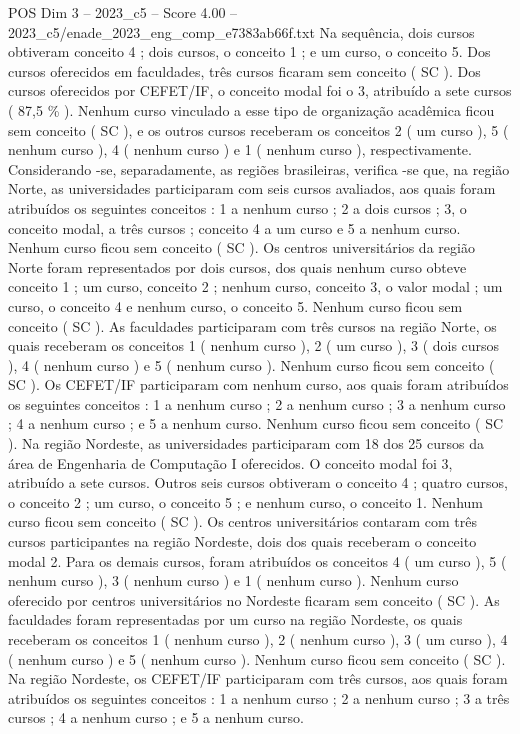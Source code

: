 \begin{textsample}{POS Dim 3 – 2023\_c5 – Score 4.00 – 2023\_c5/enade\_2023\_eng\_comp\_e7383ab66f.txt}
Na sequência, dois cursos obtiveram conceito 4 ; dois cursos, o conceito 1 ; e um curso, o conceito 5.
Dos cursos oferecidos em faculdades, três cursos ficaram sem conceito ( SC ).
Dos cursos oferecidos por CEFET/IF, o conceito modal foi o 3, atribuído a sete cursos ( 87,5 \% ).
Nenhum curso vinculado a esse tipo de organização acadêmica ficou sem conceito ( SC ), e os outros cursos receberam os conceitos 2 ( um curso ), 5 ( nenhum curso ), 4 ( nenhum curso ) e 1 ( nenhum curso ), respectivamente.
Considerando -se, separadamente, as regiões brasileiras, verifica -se que, na região Norte, as universidades participaram com seis cursos avaliados, aos quais foram atribuídos os seguintes conceitos : 1 a nenhum curso ; 2 a dois cursos ; 3, o conceito modal, a três cursos ; conceito 4 a um curso e 5 a nenhum curso.
Nenhum curso ficou sem conceito ( SC ).
Os centros universitários da região Norte foram representados por dois cursos, dos quais nenhum curso obteve conceito 1 ; um curso, conceito 2 ; nenhum curso, conceito 3, o valor modal ; um curso, o conceito 4 e nenhum curso, o conceito 5.
Nenhum curso ficou sem conceito ( SC ).
As faculdades participaram com três cursos na região Norte, os quais receberam os conceitos 1 ( nenhum curso ), 2 ( um curso ), 3 ( dois cursos ), 4 ( nenhum curso ) e 5 ( nenhum curso ).
Nenhum curso ficou sem conceito ( SC ).
Os CEFET/IF participaram com nenhum curso, aos quais foram atribuídos os seguintes conceitos : 1 a nenhum curso ; 2 a nenhum curso ; 3 a nenhum curso ; 4 a nenhum curso ; e 5 a nenhum curso.
Nenhum curso ficou sem conceito ( SC ).
Na região Nordeste, as universidades participaram com 18 dos 25 cursos da área de Engenharia de Computação I oferecidos.
O conceito modal foi 3, atribuído a sete cursos.
Outros seis cursos obtiveram o conceito 4 ; quatro cursos, o conceito 2 ; um curso, o conceito 5 ; e nenhum curso, o conceito 1.
Nenhum curso ficou sem conceito ( SC ).
Os centros universitários contaram com três cursos participantes na região Nordeste, dois dos quais receberam o conceito modal 2.
Para os demais cursos, foram atribuídos os conceitos 4 ( um curso ), 5 ( nenhum curso ), 3 ( nenhum curso ) e 1 ( nenhum curso ).
Nenhum curso oferecido por centros universitários no Nordeste ficaram sem conceito ( SC ).
As faculdades foram representadas por um curso na região Nordeste, os quais receberam os conceitos 1 ( nenhum curso ), 2 ( nenhum curso ), 3 ( um curso ), 4 ( nenhum curso ) e 5 ( nenhum curso ).
Nenhum curso ficou sem conceito ( SC ).
Na região Nordeste, os CEFET/IF participaram com três cursos, aos quais foram atribuídos os seguintes conceitos : 1 a nenhum curso ; 2 a nenhum curso ; 3 a três cursos ; 4 a nenhum curso ; e 5 a nenhum curso.

\end{textsample}
